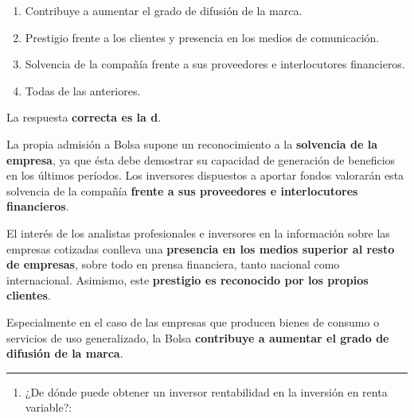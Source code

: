\documentclass[
  letterpaper,
  DIV=11,
  numbers=noendperiod]{scrreprt}
\providecommand{\tightlist}{%
  \setlength{\itemsep}{0pt}\setlength{\parskip}{0pt}}\usepackage{longtable,booktabs,array}
\begin{document}
\begin{enumerate}
\def\labelenumi{\alph{enumi})}
\item
  Contribuye a aumentar el grado de difusión de la marca.
\item
  Prestigio frente a los clientes y presencia en los medios de
  comunicación.
\item
  Solvencia de la compañía frente a sus proveedores e interlocutores
  financieros.
\item
  Todas de las anteriores.
\end{enumerate}

\begin{tcolorbox}[enhanced jigsaw, left=2mm, opacityback=0, colback=white, breakable, arc=.35mm, bottomrule=.15mm, rightrule=.15mm, toprule=.15mm, leftrule=.75mm, colframe=quarto-callout-tip-color-frame]
\begin{minipage}[t]{5.5mm}
\textcolor{quarto-callout-tip-color}{\faLightbulb}
\end{minipage}%
\begin{minipage}[t]{\textwidth - 5.5mm}

La respuesta \textbf{correcta es la d}.

La propia admisión a Bolsa supone un reconocimiento a la
\textbf{solvencia de la empresa}, ya que ésta debe demostrar su
capacidad de generación de beneficios en los últimos períodos. Los
inversores dispuestos a aportar fondos valorarán esta solvencia de la
compañía \textbf{frente a sus proveedores e interlocutores financieros}.

El interés de los analistas profesionales e inversores en la información
sobre las empresas cotizadas conlleva una \textbf{presencia en los
medios superior al resto de empresas}, sobre todo en prensa financiera,
tanto nacional como internacional. Asimismo, este \textbf{prestigio es
reconocido por los propios clientes}.

Especialmente en el caso de las empresas que producen bienes de consumo
o servicios de uso generalizado, la Bolsa \textbf{contribuye a aumentar
el grado de difusión de la marca}.

\end{minipage}%
\end{tcolorbox}

\begin{center}\rule{0.5\linewidth}{0.5pt}\end{center}

\begin{enumerate}
\def\labelenumi{\arabic{enumi}.}
\setcounter{enumi}{20}
\tightlist
\item
  ¿De dónde puede obtener un inversor rentabilidad en la inversión en
  renta variable?:
\end{enumerate}
\end{document}
